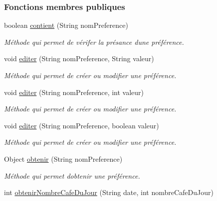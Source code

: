 \subsubsection*{Fonctions membres publiques}
\begin{DoxyCompactItemize}
\item 
boolean \hyperlink{classcom_1_1example_1_1ekawa_1_1_preference_a25b7a4cfcc9fe5f9258471ce454a718a}{contient} (String nom\+Preference)
\begin{DoxyCompactList}\small\item\em Méthode qui permet de vérifer la présance d\textquotesingle{}une préférence. \end{DoxyCompactList}\item 
void \hyperlink{classcom_1_1example_1_1ekawa_1_1_preference_a5af7a0595acfd41f1bd0b34ca0bfcb2a}{editer} (String nom\+Preference, String valeur)
\begin{DoxyCompactList}\small\item\em Méthode qui permet de créer ou modifier une préférence. \end{DoxyCompactList}\item 
void \hyperlink{classcom_1_1example_1_1ekawa_1_1_preference_a7c14e4d338ffca5c03fda6b16289d8ce}{editer} (String nom\+Preference, int valeur)
\begin{DoxyCompactList}\small\item\em Méthode qui permet de créer ou modifier une préférence. \end{DoxyCompactList}\item 
void \hyperlink{classcom_1_1example_1_1ekawa_1_1_preference_a701dc293c4474f59028733e94b49b9da}{editer} (String nom\+Preference, boolean valeur)
\begin{DoxyCompactList}\small\item\em Méthode qui permet de créer ou modifier une préférence. \end{DoxyCompactList}\item 
Object \hyperlink{classcom_1_1example_1_1ekawa_1_1_preference_a485d7fe31708aa1b85c0e2dcdcc05c0d}{obtenir} (String nom\+Preference)
\begin{DoxyCompactList}\small\item\em Méthode qui permet d\textquotesingle{}obtenir une préférence. \end{DoxyCompactList}\item 
int \hyperlink{classcom_1_1example_1_1ekawa_1_1_preference_a5a8f4c9f845924a0ebb3aec5ca99a5f5}{obtenir\+Nombre\+Cafe\+Du\+Jour} (String date, int nombre\+Cafe\+Du\+Jour)

\end{DoxyCompactItemize}

